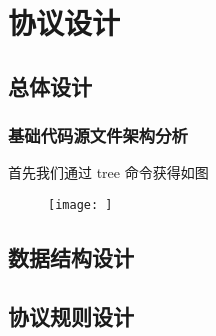 

\chapter{协议设计}

\section{总体设计}

\subsection{基础代码源文件架构分析}
首先我们通过 tree 命令获得如图

\begin{figure}
  \centering
  \texttt{[image: ]}
\end{figure}

\section{数据结构设计}

\section{协议规则设计}
